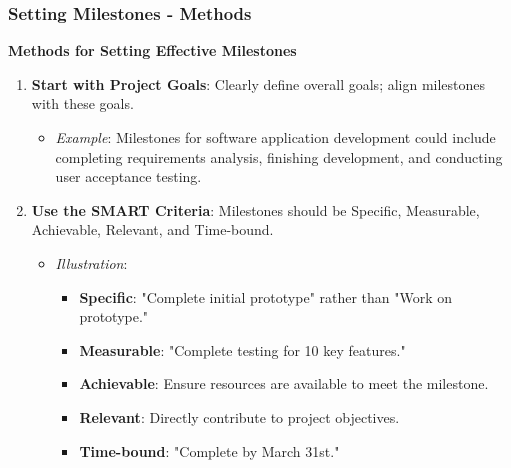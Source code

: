 \documentclass[aspectratio=169]{beamer}
\begin{document}
\begin{frame}[fragile]
    \frametitle{Setting Milestones - Methods}
    \textbf{Methods for Setting Effective Milestones}

    \begin{enumerate}
        \item \textbf{Start with Project Goals}: Clearly define overall goals; align milestones with these goals.
        \begin{itemize}
            \item \textit{Example}: Milestones for software application development could include completing requirements analysis, finishing development, and conducting user acceptance testing.
        \end{itemize}

        \item \textbf{Use the SMART Criteria}: Milestones should be Specific, Measurable, Achievable, Relevant, and Time-bound.
        \begin{itemize}
            \item \textit{Illustration}: 
                \begin{itemize}
                    \item \textbf{Specific}: "Complete initial prototype" rather than "Work on prototype."
                    \item \textbf{Measurable}: "Complete testing for 10 key features."
                    \item \textbf{Achievable}: Ensure resources are available to meet the milestone.
                    \item \textbf{Relevant}: Directly contribute to project objectives.
                    \item \textbf{Time-bound}: "Complete by March 31st."
                \end{itemize}
        \end{itemize}
    \end{enumerate}
\end{frame}
\end{document}
